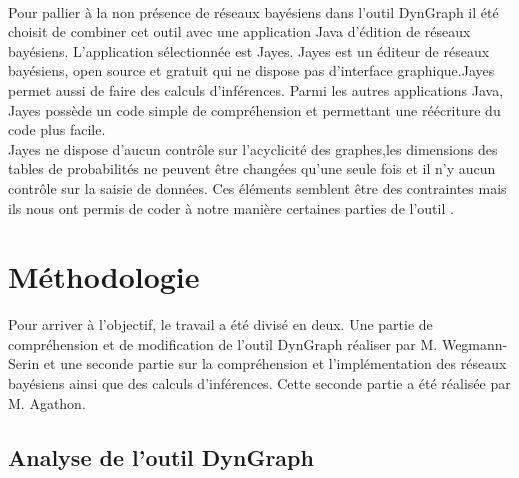 \documentclass[conference]{IEEEtran}
\begin{document}
\\
Pour pallier à la non présence de réseaux bayésiens dans l'outil DynGraph il été choisit de combiner cet outil avec une application Java d'édition de réseaux bayésiens. L'application sélectionnée est Jayes. Jayes est un éditeur de réseaux bayésiens, open source et gratuit qui ne dispose pas d'interface graphique.Jayes permet aussi de faire des calculs d'inférences. Parmi les autres applications Java, Jayes possède un code simple de compréhension et permettant une réécriture du code plus facile. \\
Jayes ne dispose d'aucun contrôle sur l'acyclicité des graphes,les dimensions des tables de probabilités ne peuvent être changées qu'une seule fois et il n'y aucun contrôle sur la saisie de données. Ces éléments semblent être des contraintes mais ils nous ont permis de coder à notre manière certaines parties de l'outil .\\ 




\section{Méthodologie}

Pour arriver à l'objectif, le travail a été divisé en deux. Une partie de compréhension et de modification de l'outil DynGraph réaliser par M. Wegmann-Serin et une seconde partie sur la compréhension et l'implémentation des réseaux bayésiens ainsi que des calculs d'inférences. Cette seconde partie a été réalisée par M. Agathon. \\


\subsection{Analyse de l'outil DynGraph}
\end{document}
